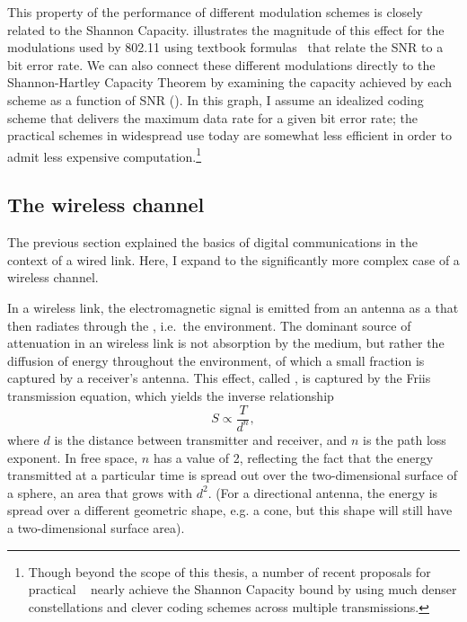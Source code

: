 This property of the performance of different modulation schemes is closely related to the Shannon Capacity.  illustrates the magnitude of this effect for the modulations used by 802.11 using textbook formulas~\cite{Sklar} that relate the SNR to a bit error rate. We can also connect these different modulations directly to the Shannon-Hartley Capacity Theorem by examining the capacity achieved by each scheme as a function of SNR (). In this graph, I assume an idealized coding scheme that delivers the maximum data rate for a given bit error rate; the practical schemes in widespread use today are somewhat less efficient in order to admit less expensive computation.\footnote{Though beyond the scope of this thesis, a number of recent proposals for practical ~\cite{Gudipati_Strider,Perry_Spinal} nearly achieve the Shannon Capacity bound by using much denser constellations and clever coding schemes across multiple transmissions.}

\subsection{The wireless channel}
The previous section explained the basics of digital communications in the context of a wired link. Here, I expand to the significantly more complex case of a wireless channel.

In a wireless link, the electromagnetic signal is emitted from an antenna as a  that then radiates through the , i.e.\ the environment. The dominant source of attenuation in an wireless link is not absorption by the medium, but rather the diffusion of energy throughout the environment, of which a small fraction is captured by a receiver's antenna. This effect, called , is captured by the Friis transmission equation, which yields the inverse relationship
\begin{equation}
\label{eq:friis}
	S \propto \frac{T}{d^n},
\end{equation}
where $d$ is the distance between transmitter and receiver, and $n$ is the path loss exponent. In free space, $n$ has a value of 2, reflecting the fact that the energy transmitted at a particular time is spread out over the two-dimensional surface of a sphere, an area that grows with $d^2$. (For a directional antenna, the energy is spread over a different geometric shape, e.g. a cone, but this shape will still have a two-dimensional surface area).

